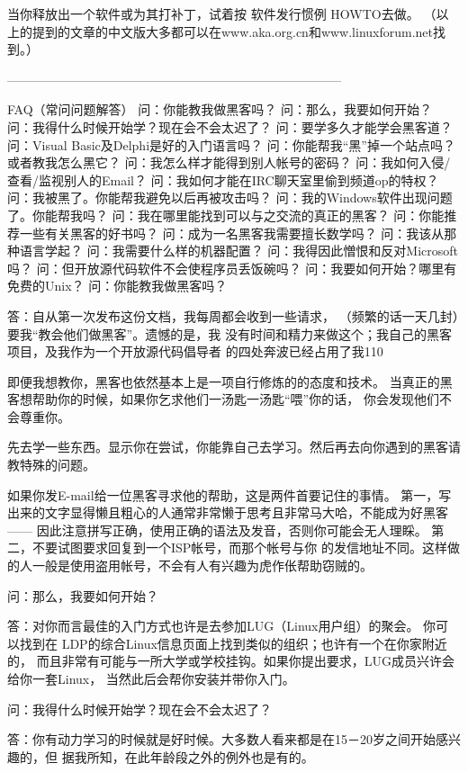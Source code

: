 \documentclass[a4paper,12pt,UTF8,twoside]{ctexbook}
\begin{document}
当你释放出一个软件或为其打补丁，试着按 软件发行惯例 HOWTO去做。 （以上的提到的文章的中文版大多都可以在www.aka.org.cn和www.linuxforum.net找到。）


--------------------------------------------------------------------------------

FAQ（常问问题解答）
问：你能教我做黑客吗？
问：那么，我要如何开始？
问：我得什么时候开始学？现在会不会太迟了？
问：要学多久才能学会黑客道？
问：Visual Basic及Delphi是好的入门语言吗？
问：你能帮我“黑”掉一个站点吗？或者教我怎么黑它？
问：我怎么样才能得到别人帐号的密码？
问：我如何入侵/查看/监视别人的Email？
问：我如何才能在IRC聊天室里偷到频道op的特权？
问：我被黑了。你能帮我避免以后再被攻击吗？
问：我的Windows软件出现问题了。你能帮我吗？
问：我在哪里能找到可以与之交流的真正的黑客？
问：你能推荐一些有关黑客的好书吗？
问：成为一名黑客我需要擅长数学吗？
问：我该从那种语言学起？
问：我需要什么样的机器配置？
问：我得因此憎恨和反对Microsoft吗？
问：但开放源代码软件不会使程序员丢饭碗吗？
问：我要如何开始？哪里有免费的Unix？
问：你能教我做黑客吗？

答：自从第一次发布这份文档，我每周都会收到一些请求， （频繁的话一天几封）要我“教会他们做黑客”。遗憾的是，我 没有时间和精力来做这个；我自己的黑客项目，及我作为一个开放源代码倡导者 的四处奔波已经占用了我110%

即便我想教你，黑客也依然基本上是一项自行修炼的的态度和技术。 当真正的黑客想帮助你的时候，如果你乞求他们一汤匙一汤匙“喂”你的话， 你会发现他们不会尊重你。

先去学一些东西。显示你在尝试，你能靠自己去学习。然后再去向你遇到的黑客请教特殊的问题。

如果你发E-mail给一位黑客寻求他的帮助，这是两件首要记住的事情。 第一，写出来的文字显得懒且粗心的人通常非常懒于思考且非常马大哈，不能成为好黑客—— 因此注意拼写正确，使用正确的语法及发音，否则你可能会无人理睬。 第二，不要试图要求回复到一个ISP帐号，而那个帐号与你 的发信地址不同。这样做的人一般是使用盗用帐号，不会有人有兴趣为虎作伥帮助窃贼的。

问：那么，我要如何开始？

答：对你而言最佳的入门方式也许是去参加LUG（Linux用户组）的聚会。 你可以找到在 LDP的综合Linux信息页面上找到类似的组织；也许有一个在你家附近的， 而且非常有可能与一所大学或学校挂钩。如果你提出要求，LUG成员兴许会给你一套Linux， 当然此后会帮你安装并带你入门。

问：我得什么时候开始学？现在会不会太迟了？

答：你有动力学习的时候就是好时候。大多数人看来都是在15－20岁之间开始感兴趣的，但 据我所知，在此年龄段之外的例外也是有的。
\end{document}
